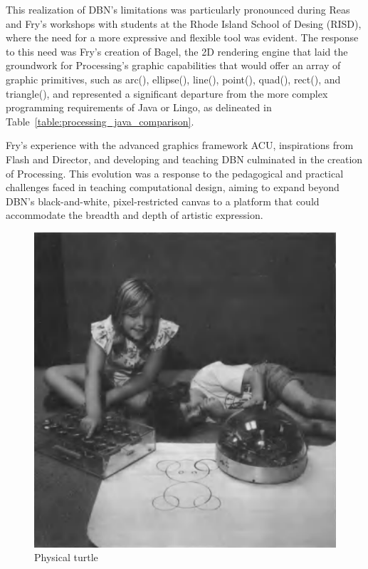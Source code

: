 This realization of DBN's limitations was particularly pronounced during Reas and Fry's workshops with students at the Rhode Island School of Desing (RISD), where the need for a more expressive and flexible tool was evident\parencite{fryModernPrometheusHistory2018}. The response to this need was Fry's creation of Bagel, the 2D rendering engine that laid the groundwork for Processing's graphic capabilities that would offer an array of graphic primitives, such as arc(), ellipse(), line(), point(), quad(), rect(), and triangle(), and represented a significant departure from the more complex programming requirements of Java or Lingo, as delineated in Table~\ref{table:processing_java_comparison}.

Fry's experience with the advanced graphics framework ACU, inspirations from Flash and Director, and developing and teaching DBN culminated in the creation of Processing. This evolution was a response to the pedagogical and practical challenges faced in teaching computational design, aiming to expand beyond DBN's black-and-white, pixel-restricted canvas to a platform that could accommodate the breadth and depth of artistic expression.

\begin{figure}
    \includegraphics[max width=\textwidth]{images/turtle.png}
    \caption{Physical turtle \parencite[ii]{papertMindstormsChildrenComputers1980}}
    \label{fig:turtle-commands}
  \end{figure}

